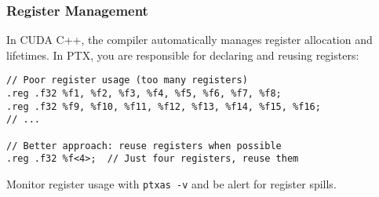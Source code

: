 \subsubsection{Register Management}

In CUDA C++, the compiler automatically manages register allocation and lifetimes. In PTX, you are responsible for declaring and reusing registers:

\begin{lstlisting}[style=ptx]
// Poor register usage (too many registers)
.reg .f32 %f1, %f2, %f3, %f4, %f5, %f6, %f7, %f8;
.reg .f32 %f9, %f10, %f11, %f12, %f13, %f14, %f15, %f16;
// ...

// Better approach: reuse registers when possible
.reg .f32 %f<4>;  // Just four registers, reuse them
\end{lstlisting}

Monitor register usage with \texttt{ptxas -v} and be alert for register spills.

